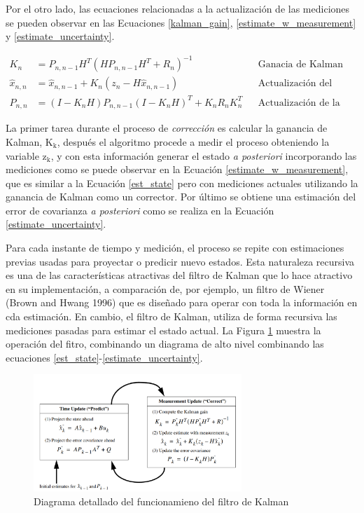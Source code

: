 \documentclass[10pt,a4paper]{article}
\begin{document}
\noindent Por el otro lado, las ecuaciones relacionadas a la actualizaci\'on de 
las mediciones se pueden observar en las Ecuaciones \ref{kalman_gain},
\ref{estimate_w_measurement} y \ref{estimate_uncertainty}.

\begin{align}
    K_n &= P_{n, n-1}H^T(HP_{n,n-1}H^T + R_n)^{-1} & & \textrm{Ganacia de Kalman}
    \label{kalman_gain}\\
    \hat{x}_{n, n} &= \hat{x}_{n,n-1} + K_n \left(z_n - H\hat{x}_{n, n-1}\right)
    & & \textrm{Actualizaci\'on del estado}\label{estimate_w_measurement}\\
    P_{n, n} &= \left(I - K_nH\right)P_{n,n-1}\left(I - K_nH\right)^T + K_n R_n
    K_n^T & & \textrm{Actualizaci\'on de la covarianza}
    \label{estimate_uncertainty}
\end{align}

\noindent La primer tarea durante el proceso de \emph{correcci\'on} es calcular 
la ganancia de Kalman, $\mathrm{K_k}$, despu\'es el algoritmo procede a medir el
proceso obteniendo la variable $\mathrm{z_k}$, y con esta informaci\'on generar
el estado \emph{a posteriori} incorporando las mediciones como se puede observar
en la Ecuaci\'on \ref{estimate_w_measurement}, que es similar a la Ecuaci\'on
\ref{est_state} pero con mediciones actuales utilizando la ganancia de Kalman
como un corrector. Por \'ultimo se obtiene una estimaci\'on del error de
covarianza \emph{a posteriori} como se realiza en la Ecuaci\'on
\ref{estimate_uncertainty}. 

\noindent Para cada instante de tiempo y medici\'on, el proceso se repite con 
estimaciones previas usadas para proyectar o predicir nuevo estados. Esta 
naturaleza recursiva es una de las caracter\'isticas atractivas del filtro de 
Kalman que lo hace atractivo en su implementaci\'on, a comparaci\'on de, por 
ejemplo, un filtro de Wiener (Brown and Hwang 1996) que es diseñado para operar 
con toda la informaci\'on en cda estimaci\'on. En cambio, el filtro de Kalman, 
utiliza de forma recursiva las mediciones pasadas para estimar el estado actual.
La Figura \ref{complete_kf} muestra la operaci\'on del fitro, combinando un
diagrama de alto nivel combinando las ecuaciones 
\ref{est_state}-\ref{estimate_uncertainty}.

\begin{figure}[h!]
    \begin{center}
        \includegraphics[width=0.7\textwidth]{kf_complete.png}
        \caption{Diagrama detallado del funcionamieno del filtro de Kalman}
        \label{complete_kf}
    \end{center}
\end{figure}
\end{document}
